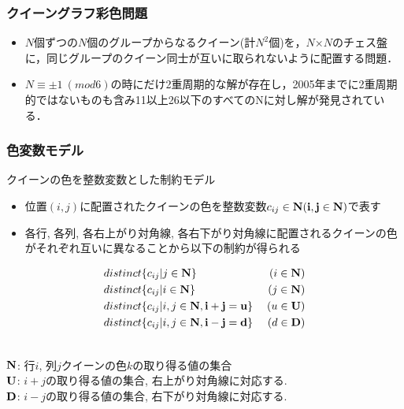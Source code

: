\documentclass [dvipdfmx,12pt]{beamer}
\begin{document}
\begin{frame}
\frametitle{クイーングラフ彩色問題}
\begin{itemize}
\item $N$個ずつの$N$個のグループからなるクイーン(計$N^2$個)を，$N$×$N$のチェス盤に，同じグループのクイーン同士が互いに取られないように配置する問題．
\item $N \equiv \pm 1 \: (mod6)$の時にだけ2重周期的な解が存在し，2005年までに2重周期的ではないものも含み11以上26以下のすべてのNに対し解が発見されている．
\end{itemize}
\end{frame}



\begin{frame}
\frametitle{色変数モデル}
{\small
\alert{クイーンの色}を整数変数とした制約モデル\\
\setlength{\abovedisplayskip}{1pt} %
\setlength{\belowdisplayskip}{1pt} %
\begin{block}{}
\begin{itemize}
\item 位置$(i, j)$に配置されたクイーンの色を整数変数$c_{ij} \in \bf N (i, j \in \bf N)$で表す
\item \alert{各行}, \alert{各列}, \alert{各右上がり対角線}, \alert{各右下がり対角線}に配置されるクイーンの色がそれぞれ互いに異なることから以下の制約が得られる
\end{itemize}
\vspace{-0.5\baselineskip}           %
\begin{eqnarray*}
& distinct\{c_{ij} | j \in \bf N\} \; & (i \in \bf N)\\
& distinct\{c_{ij} | i \in \bf N\} \; & (j \in \bf N)\\
& distinct\{c_{ij} | i, j \in \bf N,  i+j=u\} \; & (u \in \bf U)\\
& distinct\{c_{ij} | i, j \in \bf N,  i-j=d\} \; & (d \in \bf D)
\end{eqnarray*}
\end{block}
}
\\
{\footnotesize
$\bf N$: 行$i$, 列$j$クイーンの色$k$の取り得る値の集合\\
$\bf U$: $i+j$の取り得る値の集合, 右上がり対角線に対応する.\\
$\bf D$: $i-j$の取り得る値の集合, 右下がり対角線に対応する.\\
}
\end{frame}
\end{document}
